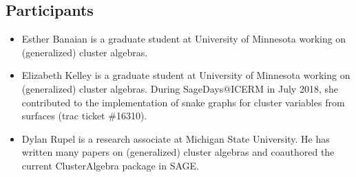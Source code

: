 \documentclass{amsart}
\begin{document}
  \subsection*{Participants}
  \begin{itemize}
    \item Esther Banaian is a graduate student at University of Minnesota working on (generalized) cluster algebras.
    \item Elizabeth Kelley is a graduate student at University of Minnesota working on (generalized) cluster algebras.  During SageDays@ICERM in July 2018, she contributed to the implementation of snake graphs for cluster variables from surfaces (trac ticket \#16310).
    \item Dylan Rupel is a research associate at Michigan State University.
      He has written many papers on (generalized) cluster algebras and coauthored the current ClusterAlgebra package in SAGE.
  \end{itemize}
\end{document}

